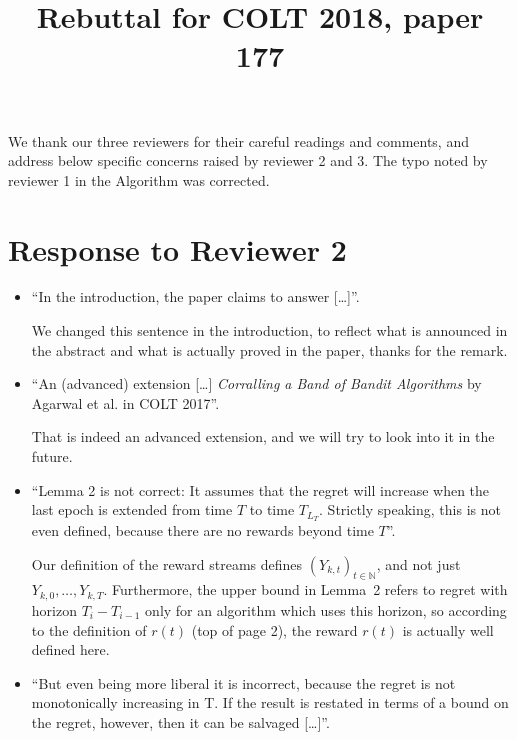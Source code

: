 \documentclass[anon,12pt]{colt2018} %
\title{Rebuttal for COLT 2018, paper 177}
\begin{document}
\maketitle


We thank our three reviewers for their careful readings and comments,
and address below specific concerns raised by reviewer 2 and 3.
The typo noted by reviewer 1 in the Algorithm was corrected.


\section{Response to Reviewer 2}

\begin{itemize}
    \item
    ``In the introduction, the paper claims to answer [\ldots]''.

    We changed this sentence in the introduction, to reflect what is announced in the abstract and what is actually proved in the paper, thanks for the remark.

    \item
    ``An (advanced) extension [\ldots] \emph{Corralling a Band of Bandit Algorithms} by Agarwal et al. in COLT 2017''.

    That is indeed an advanced extension, and we will try to look into it in the future.

    \item
    ``Lemma 2 is not correct: It assumes that the regret will increase when the last epoch is extended from time $T$ to time $T_{L_T}$. Strictly speaking, this is not even defined, because there are no rewards beyond time $T$''.

    Our definition of the reward streams defines $(Y_{k,t})_{t\in\mathbb{N}}$, and not just $Y_{k,0},\dots,Y_{k,T}$.
    Furthermore, the upper bound in Lemma~2 refers to regret with horizon $T_i - T_{i-1}$ only for an algorithm which uses this horizon, so according to the definition of $r(t)$ (top of page 2), the reward $r(t)$ is actually well defined here.

    \item
    ``But even being more liberal it is incorrect, because the regret is not monotonically increasing in T. If the result is restated in terms of a bound on the regret, however, then it can be salvaged [\ldots]''.


\end{itemize}
\end{document}
